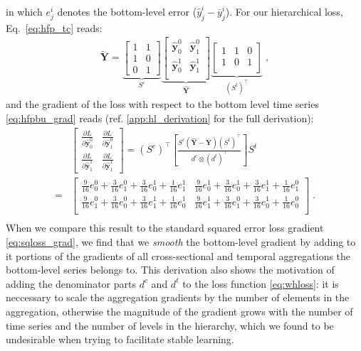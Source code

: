 \documentclass[preprint, 3p, times, twocolumn]{elsarticle}
\begin{document}
in which \(e^i_j\) denotes the bottom-level error (\(\hat{y}^i_j - \bar{y}^i_j\)).
For our hierarchical loss, Eq.~\eqref{eq:hfp_tc} reads:
\begin{align}
  \tilde{\textbf{Y}} = \underbrace{
    \begin{bmatrix}
    1 &1 \\
    1 &0 \\
    0 &1
    \end{bmatrix}}_{S^c}
    \underbrace{    
    \begin{bmatrix}
      \hat{\textbf{y}}^0_{0} & \hat{\textbf{y}}^0_{1} \\
      \hat{\textbf{y}}^1_{0} & \hat{\textbf{y}}^1_{1} \\
    \end{bmatrix}}_{\hat{\textbf{Y}}}
    \underbrace{
    \begin{bmatrix}
      1 &1 &0\\
      1 &0 &1\\
      \end{bmatrix}}_{(S^t)^\intercal}     
    \;,
\end{align}
and the gradient of the loss with respect to the bottom level time series \eqref{eq:hfpbu_grad} reads (ref. \ref{app:hl_derivation} for the full derivation):
\begin{align*} 
  &\begin{bmatrix}
  \frac{\partial L}{\partial \hat{\textbf{y}}^0_{0}} & \frac{\partial L}{\partial \hat{\textbf{y}}^0_{1}} \\
  \frac{\partial L}{\partial \hat{\textbf{y}}^1_{1}} & \frac{\partial L}{\partial \hat{\textbf{y}}^1_{1}}
  \end{bmatrix} 
  = (S^c)^\intercal \left[ \frac{S^c \left(\hat{\textbf{Y}} - \bar{\textbf{Y}}\right) (S^t)^\intercal}{ d^c \otimes (d^t)^\intercal } \right] S^t \\
  = 
  &\begin{bmatrix}
    \frac{9}{16}e_0^0 + \frac{3}{16}e_1^0 + \frac{3}{16}e_0^1 + \frac{1}{16}e_1^1 & \frac{9}{16}e_0^1 + \frac{3}{16}e_0^1 + \frac{3}{16}e_1^1 + \frac{1}{16}e_1^0 \\
    \frac{9}{16}e_1^0 + \frac{3}{16}e_0^0 + \frac{3}{16}e_1^1 + \frac{1}{16}e_0^1 & \frac{9}{16}e_1^1 + \frac{3}{16}e_1^0 + \frac{3}{16}e_0^1 + \frac{1}{16}e_0^0 \\
  \end{bmatrix}  \;. \nonumber \\         
\end{align*}
When we compare this result to the standard squared error loss gradient \eqref{eq:sqloss_grad}, we find that we \textit{smooth} the bottom-level gradient by adding to it portions of the gradients of all cross-sectional and temporal aggregations the bottom-level series belongs to. This derivation also shows the motivation of adding the denominator parts \(d^c\) and \(d^t\) to the loss function \eqref{eq:whloss}: it is neccessary to scale the aggregation gradients by the number of elements in the aggregation, otherwise the magnitude of the gradient grows with the number of time series and the number of levels in the hierarchy, which we found to be undesirable when trying to facilitate stable learning.
  
\end{document}
